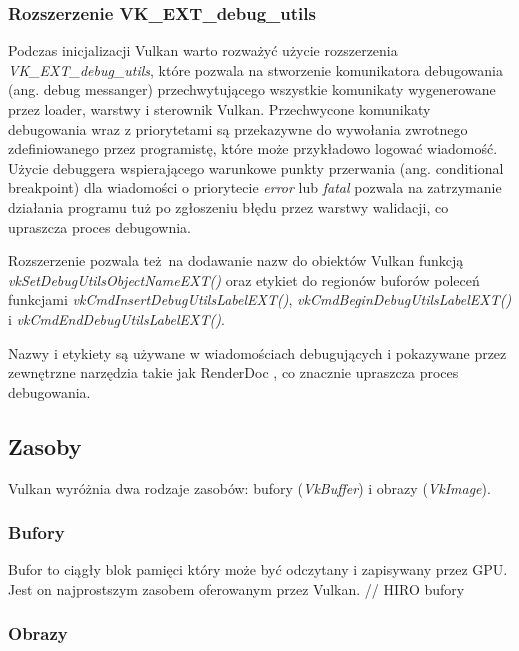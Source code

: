 \subsubsection{Rozszerzenie VK\_EXT\_debug\_utils}

Podczas inicjalizacji Vulkan warto rozważyć użycie rozszerzenia \textit{VK\_EXT\_debug\_utils}, które pozwala na stworzenie komunikatora debugowania (ang. debug messanger) przechwytującego wszystkie komunikaty wygenerowane przez loader, warstwy i sterownik Vulkan.
Przechwycone komunikaty debugowania wraz z priorytetami są przekazywne do wywołania zwrotnego zdefiniowanego przez programistę, które może przykładowo logować wiadomość.
Użycie debuggera wspierającego warunkowe punkty przerwania (ang. conditional breakpoint) dla wiadomości o priorytecie \textit{error} lub \textit{fatal} pozwala na zatrzymanie działania programu tuż po zgłoszeniu błędu przez warstwy walidacji, co upraszcza proces debugownia.

Rozszerzenie pozwala też na dodawanie nazw do obiektów Vulkan funkcją \textit{vkSetDebugUtilsObjectNameEXT()} oraz etykiet do regionów buforów poleceń funkcjami \textit{vkCmdInsertDebugUtilsLabelEXT()}, \textit{vkCmdBeginDebugUtilsLabelEXT()} i \textit{vkCmdEndDebugUtilsLabelEXT()}.

Nazwy i etykiety są używane w wiadomościach debugujących i pokazywane przez zewnętrzne narzędzia takie jak RenderDoc \cite{RENDERDOC}, co znacznie upraszcza proces debugowania.


\subsection{Zasoby}

Vulkan wyróżnia dwa rodzaje zasobów: bufory (\textit{VkBuffer}) i obrazy (\textit{VkImage}).

\subsubsection{Bufory}

Bufor to ciągły blok pamięci który może być odczytany i zapisywany przez GPU. Jest on najprostszym zasobem oferowanym przez Vulkan.
// HIRO bufory


\subsubsection{Obrazy}

